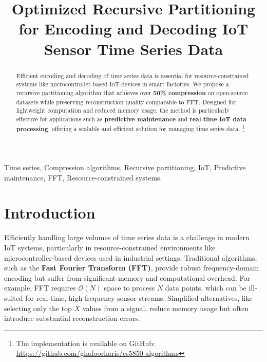 \documentclass[onecolumn,conference]{IEEEtran}
\begin{document}
\title{Optimized Recursive Partitioning for Encoding and Decoding IoT Sensor Time Series Data}

\author{
}

\maketitle

\begin{abstract}
Efficient encoding and decoding of time series data is essential for resource-constrained systems like microcontroller-based IoT devices in smart factories. We propose a recursive partitioning algorithm that achieves over \textbf{50\% compression} on open-source datasets while preserving reconstruction quality comparable to FFT. Designed for lightweight computation and reduced memory usage, the method is particularly effective for applications such as \textbf{predictive maintenance} and \textbf{real-time IoT data processing}, offering a scalable and efficient solution for managing time series data.
\footnote{The implementation is available on GitHub: \href{https://github.com/ghafoorharis/cs5850-algorithms/tree/main/project}{https://github.com/ghafoorharis/cs5850-algorithms}}

\end{abstract}

\begin{IEEEkeywords}
Time series, Compression algorithms, Recursive partitioning, IoT, Predictive maintenance, FFT, Resource-constrained systems.
\end{IEEEkeywords}

\section{Introduction}
Efficiently handling large volumes of time series data is a challenge in modern IoT systems, particularly in resource-constrained environments like microcontroller-based devices used in industrial settings. Traditional algorithms, such as the \textbf{Fast Fourier Transform (FFT)}, provide robust frequency-domain encoding but suffer from significant memory and computational overhead. For example, FFT requires $\mathcal{O}(N)$ space to process $N$ data points, which can be ill-suited for real-time, high-frequency sensor streams. Simplified alternatives, like selecting only the top $X$ values from a signal, reduce memory usage but often introduce substantial reconstruction errors.
\end{document}
